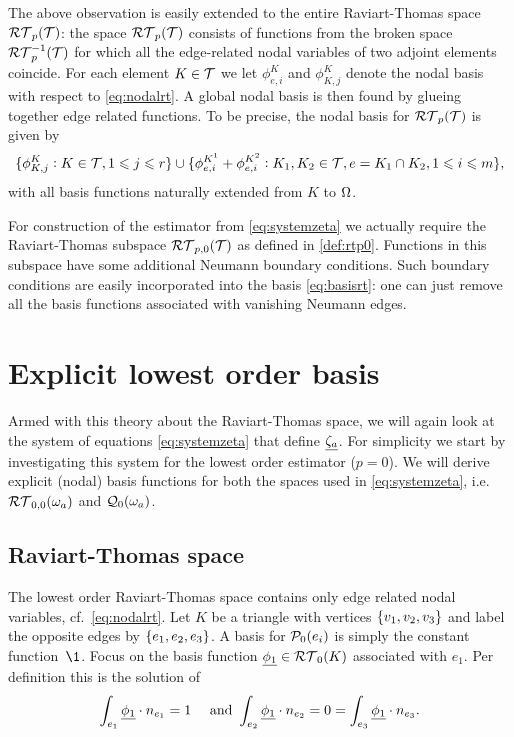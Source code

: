 \documentclass[thesis.tex]{subfiles}
\begin{document}
The above observation is easily extended to the entire Raviart-Thomas space $\RT_p( \T)$:
the space $\RT_p(\T)$ consists of functions from the broken space $\RT_p^{-1}( \T)$ for which all the edge-related
nodal variables of two adjoint elements coincide. For each element $K \in  \T$ we let $\phi^K_{e,i}$ and $\phi^K_{K,j}$
denote the nodal basis with respect to \eqref{eq:nodalrt}. A global nodal basis is then found by
glueing together edge related functions. To be precise, the nodal basis for $\RT_p( \T)$ is given by
\begin{equation}
  \label{eq:basisrt}
  \{\phi^K_{K, j} : K \in  \T, 1 \leq j \leq r\} \cup \{\phi^{K^1}_{e,i} + \phi^{K^2}_{e,i}: K_1, K_2 \in  \T, e = K_1 \cap K_2, 1 \leq i \leq m\},
\end{equation}
with all basis functions naturally extended from $K$ to $\O$.

For construction of the estimator from \eqref{eq:systemzeta} we actually require the Raviart-Thomas subspace 
$\RT_{p,0}(\T)$ as defined in \eqref{def:rtp0}.
Functions in this subspace have some additional Neumann boundary conditions.
Such boundary conditions are easily incorporated into the basis \eqref{eq:basisrt}:
one can just remove all the basis functions associated with vanishing Neumann edges.

\section{Explicit lowest order basis}
Armed with this theory about the Raviart-Thomas space, we will again look at the
system of equations \eqref{eq:systemzeta} that define $\vzeta$. For simplicity we start by
investigating this system for the lowest order estimator ($p=0$).  We will derive
explicit (nodal) basis functions for both the spaces used in \eqref{eq:systemzeta}, i.e.~$\RT_{0,0}(\w_a)$ and $\QQ_0(\w_a)$.

\subsection{Raviart-Thomas space}
The lowest order Raviart-Thomas space contains only edge related nodal variables, cf.~\eqref{eq:nodalrt}.
Let $K$ be a triangle with vertices $\set{v_1, v_2, v_3}$ and label the opposite edges by $\set{e_1, e_2, e_3}$.
A basis for $\P_0(e_i)$ is simply the constant function~$\1$.
Focus on the basis function $\v{\phi_1} \in \RT_0(K)$ associated with $e_1$.
Per definition this is the solution of
\begin{equation}
  \label{eq:solphi1}
  \int_{e_1} \v{\phi_1}\cdot n_{e_1} = 1 \quad \text{ and } \int_{e_2} \v{\phi_1} \cdot n_{e_2} = 0 = \int_{e_3} \v{\phi_1} \cdot n_{e_3}.
\end{equation}
\end{document}
